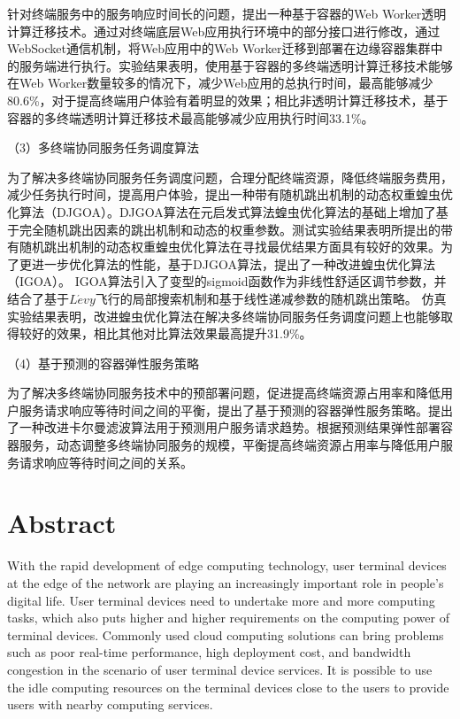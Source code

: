 针对终端服务中的服务响应时间长的问题，提出一种基于容器的Web Worker透明计算迁移技术。通过对终端底层Web应用执行环境中的部分接口进行修改，通过WebSocket通信机制，将Web应用中的Web Worker迁移到部署在边缘容器集群中的服务端进行执行。实验结果表明，使用基于容器的多终端透明计算迁移技术能够在Web Worker数量较多的情况下，减少Web应用的总执行时间，最高能够减少80.6\%，对于提高终端用户体验有着明显的效果；相比非透明计算迁移技术，基于容器的多终端透明计算迁移技术最高能够减少应用执行时间33.1\%。

（3）多终端协同服务任务调度算法 

为了解决多终端协同服务任务调度问题，合理分配终端资源，降低终端服务费用，减少任务执行时间，提高用户体验，提出一种带有随机跳出机制的动态权重蝗虫优化算法（DJGOA）。DJGOA算法在元启发式算法蝗虫优化算法的基础上增加了基于完全随机跳出因素的跳出机制和动态的权重参数。测试实验结果表明所提出的带有随机跳出机制的动态权重蝗虫优化算法在寻找最优结果方面具有较好的效果。为了更进一步优化算法的性能，基于DJGOA算法，提出了一种改进蝗虫优化算法（IGOA）。
IGOA算法引入了变型的sigmoid函数作为非线性舒适区调节参数，并结合了基于$L\acute{e}vy$飞行的局部搜索机制和基于线性递减参数的随机跳出策略。
仿真实验结果表明，改进蝗虫优化算法在解决多终端协同服务任务调度问题上也能够取得较好的效果，相比其他对比算法效果最高提升31.9\%。

（4）基于预测的容器弹性服务策略

为了解决多终端协同服务技术中的预部署问题，促进提高终端资源占用率和降低用户服务请求响应等待时间之间的平衡，提出了基于预测的容器弹性服务策略。提出了一种改进卡尔曼滤波算法用于预测用户服务请求趋势。根据预测结果弹性部署容器服务，动态调整多终端协同服务的规模，平衡提高终端资源占用率与降低用户服务请求响应等待时间之间的关系。

\chapter*{Abstract}%

With the rapid development of edge computing technology, user terminal devices at the edge of the network are playing an increasingly important role in people's digital life.
User terminal devices need to undertake more and more computing tasks, which also puts higher and higher requirements on the computing power of terminal devices.
Commonly used cloud computing solutions can bring problems such as poor real-time performance, high deployment cost, and bandwidth congestion in the scenario of user terminal device services. It is possible to use the idle computing resources on the terminal devices close to the users to provide users with nearby computing services. 

